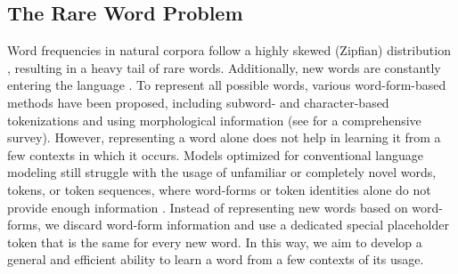 \documentclass{article}
\begin{document}
\subsection{The Rare Word Problem}
Word frequencies in natural corpora follow a highly skewed (Zipfian) distribution \citep{Zipf1949HumanBA}, resulting in a heavy tail of rare words. Additionally, new words are constantly entering the language \citep{Heaps1978InformationRC}.
To represent all possible words, various word-form-based methods have been proposed, including subword- and character-based tokenizations and using morphological information (see \citealp{Mielke2021BetweenWA} for a comprehensive survey).
However, representing a word alone does not help in learning it from a few contexts in which it occurs.
Models optimized for conventional language modeling still struggle with the usage of unfamiliar or completely novel words, tokens, or token sequences, where word-forms or token identities alone do not provide enough information \citep{Ott2018AnalyzingUI,Schick2020RareWA,wei-etal-2021-frequency,Razeghi2022ImpactOP,Kim2022UncontrolledLE,Batsuren2024EvaluatingST,Land2024FishingFM}.
Instead of representing new words based on word-forms, we discard word-form information and use a dedicated special placeholder token that is the same for every new word. In this way, we aim to develop a general and efficient ability to learn a word from a few contexts of its usage.
\end{document}
